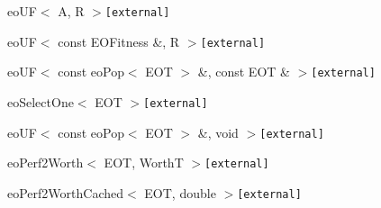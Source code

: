 \begin{CompactList}
\begin{CompactList}
\begin{CompactList}
\begin{CompactList}
\end{CompactList}
\end{CompactList}
\item eo\-UF$<$ A, R $>${\tt  [external]}\begin{CompactList}
\item {}
\end{CompactList}
\item eo\-UF$<$ const EOFitness \&, R $>${\tt  [external]}\begin{CompactList}
\item {}
\begin{CompactList}
\item {}
\end{CompactList}
\end{CompactList}
\item eo\-UF$<$ const eo\-Pop$<$ EOT $>$ \&, const EOT \& $>${\tt  [external]}\begin{CompactList}
\item eo\-Select\-One$<$ EOT $>${\tt  [external]}\begin{CompactList}
\item {}
\end{CompactList}
\end{CompactList}
\item eo\-UF$<$ const eo\-Pop$<$ EOT $>$ \&, void $>${\tt  [external]}\begin{CompactList}
\item eo\-Perf2Worth$<$ EOT, Worth\-T $>${\tt  [external]}\begin{CompactList}
\item eo\-Perf2Worth\-Cached$<$ EOT, double $>${\tt  [external]}\begin{CompactList}
\item {}
\begin{CompactList}
\item {}
\end{CompactList}
\item {}

\end{CompactList}
\end{CompactList}
\end{CompactList}
\end{CompactList}
\end{CompactList}
